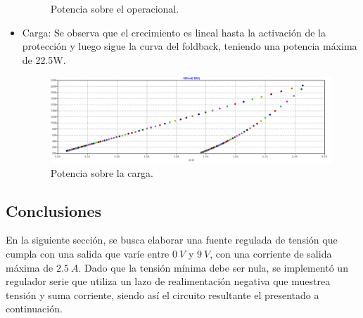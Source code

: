 \begin{itemize}
\begin{figure}[H]
	\caption{Potencia sobre el operacional.}
	\label{fig:potop}
\end{figure}
\item Carga: Se observa que el crecimiento es lineal hasta la activación de la protección y luego sigue la curva del foldback, teniendo una potencia máxima de 22.5W.
\begin{figure}[H]
\centering
	\includegraphics[width=1\textwidth]{ImagenesEjercicio2/potload.png}
	\caption{Potencia sobre la carga.}
	\label{fig:potload}
\end{figure}
\end{itemize}




\subsection{Conclusiones}











En la siguiente sección, se busca elaborar una fuente regulada de tensión que cumpla con una salida que varíe entre $0 \ V$ y $9 \ V$, con una corriente de salida máxima de $2.5 \ A$. Dado que la tensión mínima debe ser nula, se implementó un regulador serie que utiliza un lazo de realimentación negativa que muestrea tensión y suma corriente, siendo así el circuito resultante el presentado a continuación.
%

